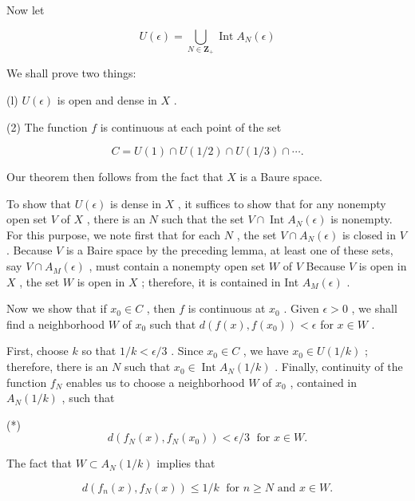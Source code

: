 \documentclass[10pt]{article}
\begin{document}
Now let

\[
U\left( \epsilon \right)  = \mathop{\bigcup }\limits_{{N \in  {\mathbf{Z}}_{ + }}}\operatorname{Int}{A}_{N}\left( \epsilon \right)
\]

We shall prove two things:

(l) \(U\left( \epsilon \right)\) is open and dense in \(X\) .

(2) The function \(f\) is continuous at each point of the set

\[
C = U\left( 1\right)  \cap  U\left( {1/2}\right)  \cap  U\left( {1/3}\right)  \cap  \cdots .
\]

Our theorem then follows from the fact that \(X\) is a Baure space.

To show that \(U\left( \epsilon \right)\) is dense in \(X\) , it suffices to show that for any nonempty open set \(V\) of \(X\) , there is an \(N\) such that the set \(V \cap  \operatorname{Int}{A}_{N}\left( \epsilon \right)\) is nonempty. For this purpose, we note first that for each \(N\) , the set \(V \cap  {A}_{N}\left( \epsilon \right)\) is closed in \(V\) . Because \(V\) is a Baire space by the preceding lemma, at least one of these sets, say \(V \cap  {A}_{M}\left( \epsilon \right)\) , must contain a nonempty open set \(W\) of \(V\) Because \(V\) is open in \(X\) , the set \(W\) is open in \(X\) ; therefore, it is contained in Int \({A}_{M}\left( \epsilon \right)\) .

Now we show that if \({x}_{0} \in  C\) , then \(f\) is continuous at \({x}_{0}\) . Given \(\epsilon  > 0\) , we shall find a neighborhood \(W\) of \({x}_{0}\) such that \(d\left( {f\left( x\right) ,f\left( {x}_{0}\right) }\right)  < \epsilon\) for \(x \in  W\) .

First, choose \(k\) so that \(1/k < \epsilon /3\) . Since \({x}_{0} \in  C\) , we have \({x}_{0} \in  U\left( {1/k}\right)\) ; therefore, there is an \(N\) such that \({x}_{0} \in  \operatorname{Int}{A}_{N}\left( {1/k}\right)\) . Finally, continuity of the function \({f}_{N}\) enables us to choose a neighborhood \(W\) of \({x}_{0}\) , contained in \({A}_{N}\left( {1/k}\right)\) , such that

(*)
\[
d\left( {{f}_{N}\left( x\right) ,{f}_{N}\left( {x}_{0}\right) }\right)  < \epsilon /3\;\text{ for }x \in  W.
\]

The fact that \(W \subset  {A}_{N}\left( {1/k}\right)\) implies that

\[
d\left( {{f}_{n}\left( x\right) ,{f}_{N}\left( x\right) }\right)  \leq  1/k\;\text{ for }n \geq  N\text{ and }x \in  W.
\]
\end{document}
